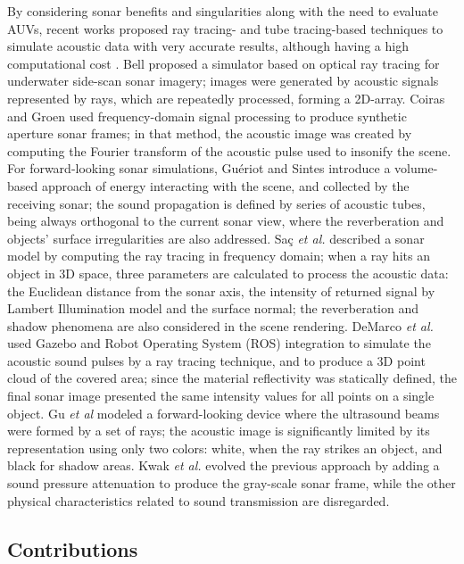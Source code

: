 \documentclass[final,5p,times]{elsarticle}
\begin{document}
By considering sonar benefits and singularities along with the need to
evaluate AUVs, recent works proposed ray tracing- and tube tracing-based
techniques to simulate acoustic data with very accurate results, although
having a high computational cost
\cite{bell1997,coiras2009,gueriot2010,sac2015,demarco2015,gu2013,kwak2015}.
Bell \cite{bell1997} proposed a simulator based on optical ray tracing for
underwater side-scan sonar imagery; images were generated by acoustic
signals represented by rays, which are repeatedly processed, forming a
2D-array. Coiras and Groen \cite{coiras2009} used frequency-domain
signal processing to produce synthetic aperture sonar frames; in that method,
the acoustic image was created by computing the Fourier transform of the
acoustic pulse used to insonify the scene. For forward-looking sonar
simulations, Guériot and Sintes \cite{gueriot2010} introduce a volume-based
approach of energy interacting with the scene, and collected by the receiving
sonar; the sound propagation is defined by series of acoustic tubes, being
always orthogonal to the current sonar view, where the reverberation and
objects' surface irregularities are also addressed. Saç \textit{et al.}
\cite{sac2015} described a sonar model by computing the ray tracing in
frequency domain; when a ray hits an object in 3D space, three parameters
are calculated to process the acoustic data: the Euclidean distance from
the sonar axis, the intensity of returned signal by Lambert Illumination
model and the surface normal; the reverberation and shadow phenomena are
also considered in the scene rendering. DeMarco \textit{et al.}
\cite{demarco2015} used Gazebo and Robot Operating System (ROS)
\cite{quigley2009} integration to simulate the acoustic sound pulses by a
ray tracing technique, and to produce a 3D point cloud of the covered area;
since the material reflectivity was statically defined, the final sonar
image presented the same intensity values for all points on a single object.
Gu \textit{et al} \cite{gu2013} modeled a forward-looking device where the
ultrasound beams were formed by a set of rays; the acoustic image is
significantly limited by its representation using only two colors: white,
when the ray strikes an object, and black for shadow areas. Kwak
\textit{et al.} \cite{kwak2015} evolved the previous approach by adding a
sound pressure attenuation to produce the gray-scale sonar frame, while
the other physical characteristics related to sound transmission are disregarded.

\subsection{Contributions}
\end{document}
